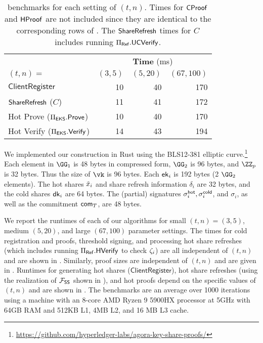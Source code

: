 \begin{table}[tb]
    \centering
    \begin{tabular}{l rrr}
        \toprule
        & \multicolumn{3}{c}{\textbf{Time} (ms)} \\
        $(t,n)=$                  & $(3,5)$ & $(5,20)$ & $(67,100)$ \\\midrule
        $\mathsf{ClientRegister}$ & 10      & 40       & 170 \\
        $\mathsf{ShareRefresh}$ ($C$)            & 11      & 41       & 172 \\
        Hot Prove ($\Pi_{\sf EKS}.\mathsf{Prove}$) & 10 & 40 & 170 \\
        Hot Verify ($\Pi_{\sf EKS}.{\mathsf{Verify}}$) & 14 & 43 & 194     \\\bottomrule
    \end{tabular}
    \caption{\sysname benchmarks for each setting of $(t,n)$. Times for $\mathsf{CProof}$ and $\mathsf{HProof}$ are not included since they are identical to the corresponding rows of . The $\mathsf{ShareRefresh}$ times for $C$ includes running $\Pi_{\sf Ref}.{\sf UC}{\mathsf{Verify}}$. }
    \label{tab:thresh_bench}
\end{table}

We implemented our construction in Rust using the BLS12-381 elliptic curve.\footnote{\url{https://github.com/hyperledger-labs/agora-key-share-proofs/}}
Each element in $\GG_1$ is 48 bytes in compressed form, $\GG_2$ is 96 bytes, and $\ZZ_p$ is 32 bytes. Thus the size of $\vk$ is 96 bytes. Each $\mathsf{ek}_i$ is 192 bytes (2 $\GG_2$ elements). The hot shares $\tilde{x}_i$ and share refresh information $\delta_i$ are 32 bytes, and the cold shares $\mathsf{dk}_i$ are 64 bytes. The (partial) signatures $\sigma_i^{\mathsf{hot}}, \sigma_i^{\mathsf{cold}}$, and $\sigma_i$, as well as the commitment $\mathsf{com}_{T}$, are 48 bytes. %

We report the runtimes of each of our algorithms for small $(t,n)=(3,5)$, %
medium $(5,20)$, %
and large $(67,100)$ parameter settings. %
The times for cold registration and proofs, threshold signing, and processing hot share refreshes (which includes running $\Pi_{\sf Ref}.{\sf H}{\mathsf{Verify}}$ to check $\zeta_i$) are all independent of $(t,n)$ and are shown in . Similarly, proof sizes are independent of $(t,n)$ and are given in . Runtimes for generating hot shares ($\mathsf{ClientRegister}$), hot share refreshes (using the realization of $\mathcal{F}_\mathsf{SS}$ shown in ), and hot proofs depend on the specific values of $(t,n)$ and are shown in .
The benchmarks are an average over 1000 iterations using a machine with an 8-core AMD Ryzen 9 5900HX processor at 5GHz with 64GB RAM and 512KB L1, 4MB L2, and 16 MB L3 cache.
